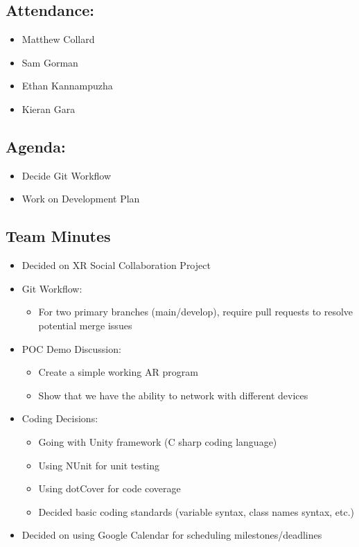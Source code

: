 \documentclass{article}
\begin{document}
\subsection*{Attendance:}
\begin{itemize}
    \item Matthew Collard
    \item Sam Gorman
    \item Ethan Kannampuzha
    \item Kieran Gara
\end{itemize}

\subsection*{Agenda:}
\begin{itemize}
    \item Decide Git Workflow
    \item Work on Development Plan
\end{itemize}

\subsection*{Team Minutes}

\begin{itemize}
    \item Decided on XR Social Collaboration Project
    \item Git Workflow:
    \begin{itemize}
        \item For two primary branches (main/develop), require pull requests to resolve potential merge issues
    \end{itemize}

    \item POC Demo Discussion:
    \begin{itemize}
        \item Create a simple working AR program
        \item Show that we have the ability to network with different devices
    \end{itemize}

    \item Coding Decisions:
    \begin{itemize}
        \item Going with Unity framework (C sharp coding language)
        \item Using NUnit for unit testing
        \item Using dotCover for code coverage
        \item Decided basic coding standards (variable syntax, class names syntax, etc.)
    \end{itemize}
    \item Decided on using Google Calendar for scheduling milestones/deadlines
\end{itemize}
\end{document}
